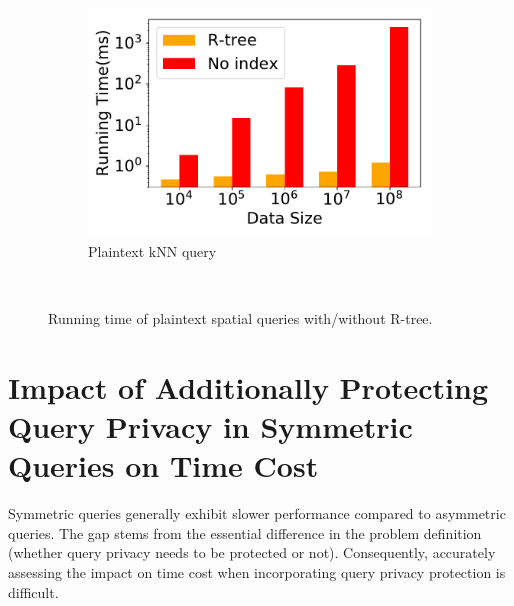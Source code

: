 \begin{figure}[t]
\begin{subfigure}{0.32\textwidth}
        \includegraphics[width=\textwidth]{apdx/knn_index.pdf}
        \caption{Plaintext kNN query}
        \label{fig:plain-knn-query}
    \end{subfigure}
    ~
	\caption{Running time of plaintext spatial queries with/without R-tree.}
	\label{fig:plaintext_query_index}
\end{figure}

\section{Impact of Additionally Protecting Query Privacy in Symmetric Queries on Time Cost}
\label{app:impact-query-privacy}

Symmetric queries generally exhibit slower performance compared to asymmetric queries.
The gap stems from the essential difference in the problem definition (\ie whether query privacy needs to be protected or not).
Consequently, accurately assessing the impact on time cost when incorporating query privacy protection is difficult.

